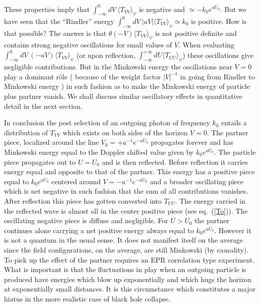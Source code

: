 \documentclass[12pt,oneside]{report}
\begin{document}
These properties imply that $\int_{-\infty}^0\!dV\ 
\langle T_{VV} \rangle_{\psi}$ is negative and $\simeq - k_0
e^{a U_0}$. But we have seen that the ``Rindler'' energy 
$\int_{-\infty}^0\!dV\  \vert a V \vert\langle T_{VV} \rangle_{\psi}\simeq k_0$
 is positive. How is that possible? The answer is that 
$\theta(-V)
\langle T_{VV} \rangle_{\psi}$ is not positive definite and
contains strong negative oscillations for small values of $V$. When
evaluating \break
$\int_{-\infty}^0\!dV\ 
(- a V ) \langle T_{VV} \rangle_{\psi}$ (or upon
reflection, $\int_{-\infty}^{+\infty} dU \langle
T_{UU} \rangle_{\psi}$) these oscillations  give   negligible contributions. But
in the Minkowski energy the oscillations near $V=0$ play a dominant
r\^ ole ( because of the weight factor $|V|^{-1}$ in going from Rindler to 
Minkowski energy ) in
such fashion as to make the Minkowski energy of particle plus partner vanish.
We shall discuss similar oscillatory effects in quantitative detail in the
next section.

In conclusion the  post selection of an outgoing photon of
frequency $k_0$ entails a distribution of $T_{VV}$ which
exists on both sides of the horizon $V=0$. The partner
piece, localized around the line $V_0=+ a^{-1} e^{-a U_0}$
propagates forever and has Minkowski energy equal to the
Doppler shifted value given by $k_0e^{a U_0}$. The particle
piece propagates out to $U=U_0$ and is then reflected.
Before reflection it carries energy equal and opposite to
that of the partner. This energy has a positive piece equal
to $k_0e^{aU_0}$ centered around $V=-a^{-1}e^{-a U_0}$ and a
broader oscillating piece which is net negative in such
fashion that the sum of all contributions vanishes. After
reflection this piece has gotten converted into $T_{UU}$. 
The energy carried in
the reflected wave is almost all in the center positive
piece (see eq.~(\ref{To})). The oscillating negative piece is diffuse and
negligible. For $U>U_0$ the partner continues alone
carrying a net positive energy always equal to
$k_0e^{aU_0}$. However it is not a quantum in the usual
sense. It does not manifest itself on the average since the field 
configurations, on the average, are still Minkowski (by causality).
 To pick up the effect of the
partner requires an EPR correlation type experiment.
 What is important is that
the fluctuations in play when an outgoing particle is
produced have energies which blow up exponentially and which
hugs the horizon at exponentially small distances. It is this
circumstance which constitutes a major hiatus in the more
realistic case of black hole collapse.
\end{document}
